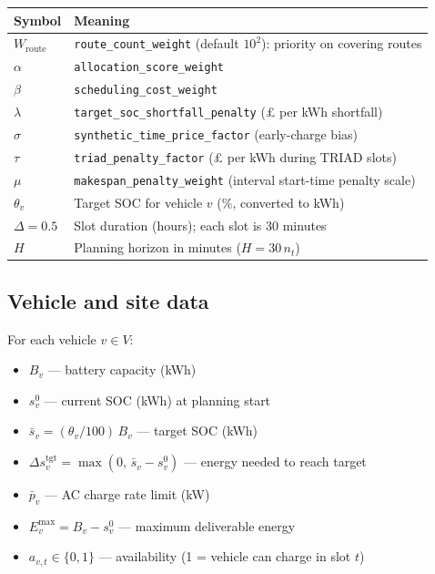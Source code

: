 \documentclass[11pt,a4paper]{article}
\newcommand{\1}{\mathbf{1}}
\begin{document}
\begin{center}
\begin{longtable}{@{}p{3.2cm}p{10cm}@{}}
\toprule
Symbol & Meaning \\
\midrule
\endhead
$W_{\mathrm{route}}$ & \texttt{route\_count\_weight} (default $10^2$): priority on covering routes \\
$\alpha$ & \texttt{allocation\_score\_weight} \\
$\beta$ & \texttt{scheduling\_cost\_weight} \\
$\lambda$ & \texttt{target\_soc\_shortfall\_penalty} (£ per kWh shortfall) \\
$\sigma$ & \texttt{synthetic\_time\_price\_factor} (early-charge bias) \\
$\tau$ & \texttt{triad\_penalty\_factor} (£ per kWh during TRIAD slots) \\
$\mu$ & \texttt{makespan\_penalty\_weight} (interval start-time penalty scale) \\
$\theta_v$ & Target SOC for vehicle $v$ (\%, converted to kWh) \\
$\Delta = 0.5$ & Slot duration (hours); each slot is 30 minutes \\
$H$ & Planning horizon in minutes ($H = 30\,n_t$) \\
\bottomrule
\end{longtable}
\end{center}

\subsection{Vehicle and site data}

For each vehicle $v \in V$:
\begin{itemize}[nosep]
  \item $B_v$ --- battery capacity (kWh)
  \item $s_v^0$ --- current SOC (kWh) at planning start
  \item $\bar{s}_v = (\theta_v/100)\,B_v$ --- target SOC (kWh)
  \item $\Delta s_v^{\mathrm{tgt}} = \max(0,\,\bar{s}_v - s_v^0)$ --- energy needed to reach target
  \item $\bar{p}_v$ --- AC charge rate limit (kW)
  \item $E_v^{\max} = B_v - s_v^0$ --- maximum deliverable energy
  \item $a_{v,t} \in \{0,1\}$ --- availability (1 = vehicle can charge in slot $t$)
\end{itemize}
\end{document}
